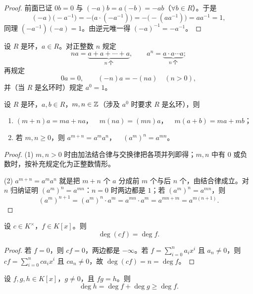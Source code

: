 \begin{proof}
前面已证 \(0b=0\) 与 \((-a)b=a(-b)=-ab\)（\(\forall b\in R\)）。于是
\[
(-a)\bigl(-a^{-1}\bigr)=-\bigl(a\cdot(-a^{-1})\bigr)=-\bigl(-(aa^{-1})\bigr)=aa^{-1}=1,
\]
同理 \((-a^{-1})(-a)=1\)。由逆元唯一得 \((-a)^{-1}=-a^{-1}\)。
\end{proof}

\begin{definition}[元素倍与方幂]
设 \(R\) 是环，\(a\in R\)。对正整数 \(n\) 规定
\[
na=\underbrace{a+a+\cdots+a}_{n\ \text{个}},\qquad
a^n=\underbrace{a\cdot a\cdots a}_{n\ \text{个}} ;
\]
再规定
\[
0a=0,\qquad (-n)a=-(na)\quad(n>0),
\]
并（当 \(R\) 是幺环时）规定 \(a^0=1\)。
\end{definition}

\begin{proposition}[元素倍与方幂的运算法则]
设 \(R\) 是环，\(a,b\in R\)，\(m,n\in\mathbb{Z}\)（涉及 \(a^0\) 时要求 \(R\) 是幺环），则
\begin{enumerate}[label=(\arabic*)]
  \item \((m+n)a=ma+na\)，\(\quad m(na)=(mn)a\)，\(\quad m(a+b)=ma+mb\)；
  \item 若 \(m,n\ge0\)，则 \(a^{m+n}=a^ma^n\)，\(\quad (a^m)^n=a^{mn}\)。
\end{enumerate}
\end{proposition}

\begin{proof}
(1) \(m,n>0\) 时由加法结合律与交换律把各项并列即得；\(m,n\) 中有 \(0\) 或负数时，按补充规定化为正整数情形。

(2) \(a^{m+n}=a^ma^n\) 就是把 \(m+n\) 个 \(a\) 分成前 \(m\) 个与后 \(n\) 个，由结合律成立。对 \(n\) 归纳证明 \((a^m)^n=a^{mn}\)：\(n=0\) 时两边都是 \(1\)；若 \((a^m)^n=a^{mn}\)，则
\[
(a^m)^{n+1}=(a^m)^n\cdot a^m=a^{mn}\cdot a^m=a^{mn+m}=a^{m(n+1)} .
\]
\end{proof}

\begin{proposition}[乘以非零常数不改变次数]
设 \(c\in K^\times\)，\(f\in K[x]\)。则
\[
\deg(cf)=\deg f .
\]
\end{proposition}

\begin{proof}
若 \(f=0\)，则 \(cf=0\)，两边都是 \(-\infty\)。若 \(f=\sum_{i=0}^{n}a_ix^i\) 且 \(a_n\ne0\)，则 \(cf=\sum_{i=0}^{n}ca_ix^i\) 且 \(ca_n\ne0\)，故 \(\deg(cf)=n=\deg f\)。
\end{proof}

\begin{proposition}[乘积的次数]
设 \(f,g,h\in K[x]\)，\(g\ne0\)，且 \(fg=h\)。则
\[
\deg h=\deg f+\deg g\ge\deg f .
\]
\end{proposition}

